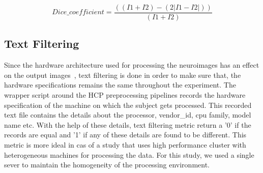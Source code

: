 \begin{equation}
  \label{eq:eq_two}
    Dice\_coefficient = \frac{((I1 + I2) - (2|I1 - I2|))}{(I1 + I2)}
\end{equation}

\iffalse
\DontPrintSemicolon
\SetKwFunction{FMain}{Convert\_image}
\SetKwProg{Fn}{Function}{:}{}
\Fn{\FMain{$image$}}{
  \begin{algorithmic}[1]
    \IF{image extension is ``.mgz":}
      \STATE convert image to ``.nii"
    \ELSE
      \STATE do nothing
    \ENDIF
  \end{algorithmic}
\KwRet image\;
}
\hfill \break
\hfill \break
\SetKwFunction{FDice}{Get\_NRMSE}
\SetKwProg{Pn}{Function}{:}{}
\Pn{\FDice{$image\-1$,$image\-2$}}{
  \begin{algorithmic}[1]
    \STATE image\_1 $\leftarrow$ Convert\_image(image\-1);
    \STATE image\_2 $\leftarrow$ Convert\_image(image\-2);
    \STATE \textbf{fslmaths} image\_1 \text{-sub} image\_2 $\rightarrow$ diff;
    \STATE nonzero\_voxels\_image1 $\leftarrow$ get the $\textless$non-zero voxels$\textgreater$ $\textless$volume$\textgreater$ from image\_1; \COMMENT{using FSL}
    \STATE nonzero\_voxels\_image2 $\leftarrow$ get the $\textless$non-zero voxels$\textgreater$ $\textless$volume$\textgreater$ from image\_2;
    \STATE nonzero\_voxels\_difference $\leftarrow$ get the $\textless$non-zero voxels$\textgreater$ $\textless$volume$\textgreater$ from difference of images;
    \STATE \textbf{Dice\_coeff} $\leftarrow$ $\frac{(nonzero\_voxels\_image1+nonzero\_voxels\_image2)-nonzero\_voxels\_difference}{(nonzero\_voxels\_image1+nonzero\_voxels\_image2)}$;
  \end{algorithmic}
\KwRet \textbf{Dice\_coeff}\;
}
\caption*{Algorithm 2: Algorithm for finding Dice coefficient similarity from images}
\label{alg:dice_algorithm}
\fi

\subsection{Text Filtering}
Since the hardware architecture used for processing the neuroimages has an effect on the output images~\cite{10.1371/journal.pone.0038234}, text filtering is done in order to make sure that, the hardware specifications remains the same throughout the experiment. The wrapper script around the HCP preprocessing pipelines records the hardware specification of the machine on which the subject gets processed. This recorded text file contains the details about the processor, vendor\_id, cpu family, model name etc. With the help of these details, text filtering metric return a '0' if the records are equal and '1' if any of these details are found to be different. This metric is more ideal in cas of a study that uses high performance cluster with heterogeneous machines for processing the data. For this study, we used a single sever to maintain the homogeneity of the processing environment.
